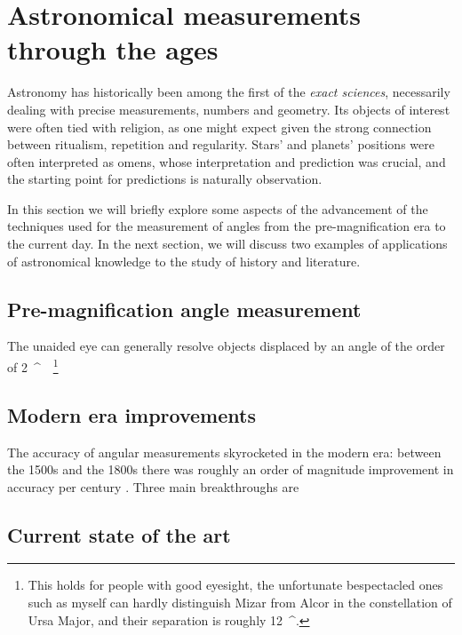 \documentclass[main.tex]{subfiles}
\begin{document}
\section{Astronomical measurements through the ages}

Astronomy has historically been among the first of the \emph{exact sciences}, necessarily dealing with precise measurements, numbers and geometry.
Its objects of interest were often tied with religion, as one might expect given the strong connection between ritualism, repetition and regularity.
Stars' and planets' positions were often interpreted as omens, whose interpretation and prediction was crucial, and the starting point for predictions is naturally observation.

In this section we will briefly explore some aspects of the advancement of the techniques used for the measurement of angles from the pre-magnification era to the current day.
In the next section, we will discuss two examples of applications of astronomical knowledge to the study of history and literature. 

\subsection{Pre-magnification angle measurement}

The unaided eye can generally resolve objects displaced by an angle of the order of \SI{2}{^\prime} \cite[pag.\ 56]{karttunenObservationsInstruments2017}.\footnote{This holds for people with good eyesight, the unfortunate bespectacled ones such as myself can hardly distinguish Mizar from Alcor in the constellation of Ursa Major, and their separation is roughly \SI{12}{^\prime}. }
\cite[]{sattarovMainInstrumentUlugh2009}



\subsection{Modern era improvements}

The accuracy of angular measurements skyrocketed in the modern era: between the 1500s and the 1800s there was roughly an order of magnitude improvement in accuracy per century \cite[]{chapmanAccuracyAngularMeasuring1983}.
Three main breakthroughs are 

\subsection{Current state of the art}
\end{document}
